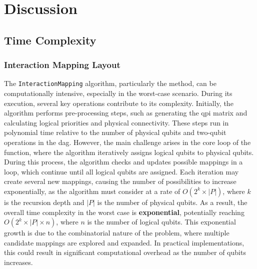 \chapter{Discussion} \label{Chap5} %
\section{Time Complexity}
\subsection{Interaction Mapping Layout} %
The \lstinline{InteractionMapping} algorithm, particularly the  method, can be computationally intensive, especially in the worst-case scenario. During its execution, several key operations contribute to its complexity. Initially, the algorithm performs pre-processing steps, such as generating the \acrfull{qpi} matrix and calculating logical priorities and physical connectivity. These steps run in polynomial time relative to the number of physical qubits and two-qubit operations in the \acrshort{dag}. However, the main challenge arises in the core loop of the  function, where the algorithm iteratively assigns logical qubits to physical qubits. \\
During this process, the algorithm checks and updates possible mappings in a  loop, which continue until all logical qubits are assigned. Each iteration may create several new mappings, causing the number of possibilities to increase exponentially, as the algorithm must consider at a rate of $O(2^k \times |P|)$, where $k$ is the recursion depth and $|P|$ is the number of physical qubits. As a result, the overall time complexity in the worst case is \textbf{exponential}, potentially reaching $O(2^k \times |P| \times n)$, where $n$ is the number of logical qubits. This exponential growth is due to the combinatorial nature of the problem, where multiple candidate mappings are explored and expanded. In practical implementations, this could result in significant computational overhead as the number of qubits increases.

